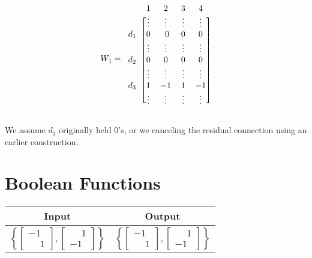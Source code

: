     \begin{equation*}
    W_1=
    \begin{blockarray}{ccccc}
        & 1& 2& 3&4 \\
        \begin{block}{c[cccc]}
                & \vdots &\vdots & \vdots & \vdots \\
                d_1 & 0 &\ 0 & 0 & 0 \\
                & \vdots &\vdots & \vdots & \vdots \\
                d_2 & 0 & 0 & 0 & 0 \\
                & \vdots &\vdots & \vdots & \vdots \\
                d_3 & 1  & -1 & 1 & -1 \\
                & \vdots &\vdots & \vdots & \vdots \\
        \end{block}
    \end{blockarray}
    \end{equation*}

    We assume $d_3$ originally held $0$'s, or we canceling the residual connection using an earlier construction.
    
\section{Boolean Functions}

    \begin{tabular}{|c|c|}
        \hline
        \rowcolor{orange!20} %
        \textbf{Input} & \textbf{Output} \\
        \hline
        $\left\{\begin{bmatrix}
            -1\\\phantom- 1
        \end{bmatrix}, \begin{bmatrix}
            \phantom- 1\\-1
        \end{bmatrix}\right\}$ & $\left\{\begin{bmatrix}
            -1\\\phantom- 1
        \end{bmatrix}, \begin{bmatrix}
            \phantom- 1\\-1
        \end{bmatrix}\right\}$ \\
        \hline
    \end{tabular}

